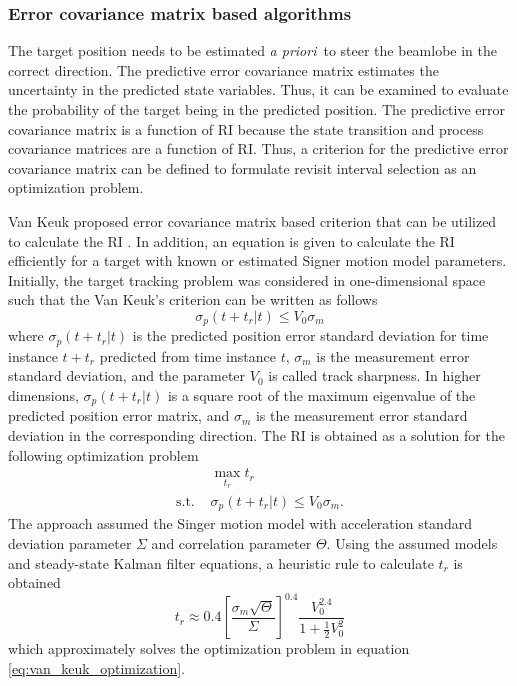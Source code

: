 \documentclass[english, 12pt, a4paper, elec, utf8, a-1b, online]{aaltothesis}
\def\prior{\textit{a priori}\ }
\newcommand{\ri}{t_r}
\begin{document}
\subsubsection{Error covariance matrix based algorithms}


The target position needs to be estimated \prior to steer the beamlobe in the correct direction. 
The predictive error covariance matrix estimates the uncertainty in the predicted state variables.
Thus, it can be examined to evaluate the probability of the target being in the predicted position.
The predictive error covariance matrix is a function of RI because the state transition and process covariance matrices are a function of RI.
Thus, a criterion for the predictive error covariance matrix can be defined to formulate revisit interval selection as an optimization problem.

Van Keuk proposed error covariance matrix based criterion that can be utilized to calculate the RI \cite{Keuk1975}.
In addition, an equation is given to calculate the RI efficiently for a target with known or estimated Signer motion model \cite{RongLi2003} parameters.
Initially, the target tracking problem was considered in one-dimensional space such that the Van Keuk's criterion can be written as follows
\begin{equation}\label{eq:criterion}
    \sigma_p(t + \ri | t) \leq V_0 \sigma_m
\end{equation}
where $\sigma_p(t + \ri | t)$ is the predicted position error standard deviation for time instance $t+\ri$ predicted from time instance $t$, $\sigma_m$ is the measurement error standard deviation, and the parameter $V_0$ is called track sharpness.
In higher dimensions, $\sigma_p(t + \ri | t)$ is a square root of the maximum eigenvalue of the predicted position error matrix, and $\sigma_m$ is the measurement error standard deviation in the corresponding direction.
The RI is obtained as a solution for the following optimization problem
\begin{equation}\label{eq:van_keuk_optimization}
\begin{array}{ll}
     & \max_{\ri} \ri \\[7pt]
    \text{s.t. } &\sigma_p(t + \ri | t) \leq V_0 \sigma_m. 
\end{array}
\end{equation}
The approach assumed the Singer motion model with acceleration standard deviation parameter $\Sigma$ and correlation parameter $\Theta$.
Using the assumed models and steady-state Kalman filter equations, a heuristic rule to calculate $\ri$ is obtained
\begin{equation}\label{eq:keuk_time}
    \ri \approx 0.4 \left[ \frac{\sigma_m \sqrt{\Theta}}{\Sigma} \right]^{0.4} \frac{V_0^{2.4}}{1+\frac{1}{2}V_0^2}
\end{equation}
which approximately solves the optimization problem in equation \eqref{eq:van_keuk_optimization}.
\end{document}
